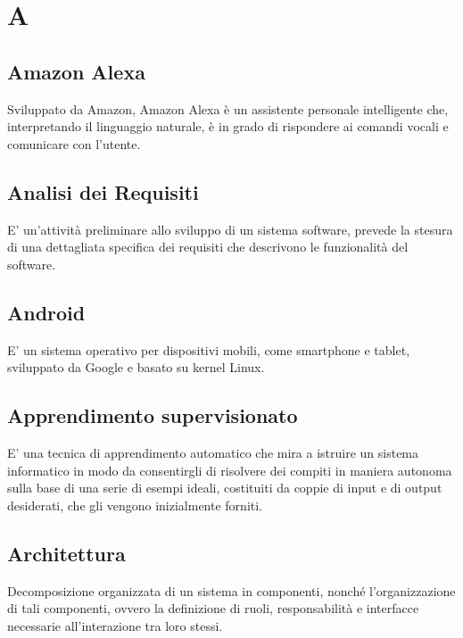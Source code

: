 \section*{A}

\subsection{Amazon Alexa}
Sviluppato da Amazon, Amazon Alexa è un assistente personale intelligente che, interpretando il linguaggio naturale, è in grado di rispondere ai comandi vocali e comunicare con l'utente. 

\subsection{Analisi dei Requisiti}
E' un'attività preliminare allo sviluppo di un sistema software, prevede la stesura di una dettagliata specifica dei requisiti che descrivono le funzionalità del software.

\subsection{Android}
E' un sistema operativo per dispositivi mobili, come smartphone e tablet, sviluppato da Google e basato su kernel Linux.

\subsection{Apprendimento supervisionato}
E' una tecnica di apprendimento automatico che mira a istruire un sistema informatico in modo da consentirgli di risolvere dei compiti in maniera autonoma sulla base di una serie di esempi ideali, costituiti da coppie di input e di output desiderati, che gli vengono inizialmente forniti.

\subsection{Architettura}
Decomposizione organizzata di un sistema in componenti, nonché l'organizzazione di tali componenti, ovvero la definizione di ruoli, responsabilità e interfacce necessarie all'interazione tra loro stessi.
